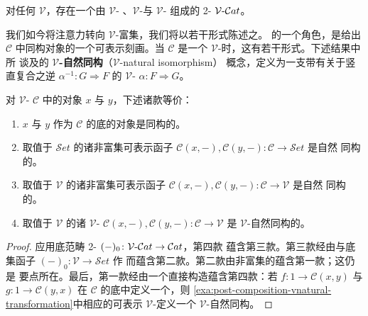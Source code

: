 \begin{corollary}\label{cor:vcat-two-category}
对任何\trCartesianClosed{}\trCategory{} $\mathcal{V}$，存在一个由 $\mathcal{V}$-%
\trCategory、$\mathcal{V}$-\trFunctor{}与 $\mathcal{V}$-\trNaturalTransformation{}%
组成的 2-\trCategory{} $\mathcal{V}\text{-}\mathcal{C}at$。
\end{corollary}

我们如今将注意力转向 $\mathcal{V}$-富集\trYonedaLemma，我们将以若干形式陈述之。
\trYonedaLemma{}的一个角色，是给出 $\mathcal{C}$ 中同构对象的一个可表示刻画。当
$\mathcal{C}$ 是一个 $\mathcal{V}$-\trCategory{}时，这有若干形式。下述结果中所
谈及的 $\mathcal{V}$\textbf{-自然同构}（$\mathcal{V}$-natural isomorphism）
概念，定义为一支带有关于竖直复合之逆 $\alpha^{-1}\colon G\Rightarrow F$ 的
$\mathcal{V}$-\trNaturalTransformation{} $\alpha\colon F\Rightarrow G$。

\begin{lemma}\label{lem:isomorphism-characterizations}
对 $\mathcal{V}$-\trCategory{} $\mathcal{C}$ 中的对象 $x$ 与 $y$，下述诸款等价：
\begin{enumerate}[label=(\roman*)]
\item $x$ 与 $y$ 作为 $\mathcal{C}$ 的底\trCategory{}的对象是同构的。
\item 取值于 $\mathcal{S}et$ 的诸非富集可表示函子
  $\mathcal{C}(x,-),\mathcal{C}(y,-)\colon\mathcal{C}\to\mathcal{S}et$ 是自然
  同构的。
\item 取值于 $\mathcal{V}$ 的诸非富集可表示函子
  $\mathcal{C}(x,-),\mathcal{C}(y,-)\colon\mathcal{C}\to\mathcal{V}$ 是自然
  同构的。
\item 取值于 $\mathcal{V}$ 的诸 $\mathcal{V}$-\trFunctor{}
  $\mathcal{C}(x,-),\mathcal{C}(y,-)\colon\mathcal{C}\to\mathcal{V}$ 是
  $\mathcal{V}$-自然同构的。
\end{enumerate}
\end{lemma}

\begin{proof}
应用底范畴 2-\trFunctor{} $(-)_{0}\colon\mathcal{V}\text{-}\mathcal{C}at\to\mathcal{C}at$，第四款
蕴含第三款。第三款经由与底集函子 $(-)_{0}\colon\mathcal{V}\to\mathcal{S}et$ 作%
\trWhiskering{}而蕴含第二款。第二款由非富集的\trYonedaLemma{}蕴含第一款；这仍是
要点所在。最后，第一款经由一个直接构造蕴含第四款：若
$f\colon 1\to\mathcal{C}(x,y)$ 与 $g\colon 1\to\mathcal{C}(y,x)$ 在 $\mathcal{C}$
的底\trCategory{}中定义一个\trIsomorphism，则%
\cref{exa:post-composition-vnatural-transformation}中相应的可表示
$\mathcal{V}$-\trNaturalTransformation{}定义一个 $\mathcal{V}$-自然同构。
\end{proof}

